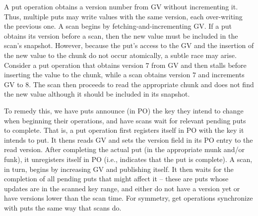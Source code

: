 

A put operation obtains a version number from GV without incrementing it. Thus, multiple puts may write values with the same version, each over-writing the previous one. 
A scan begins by fetching-and-incrementing GV.
If a put obtains its version before a scan, then the new value must be included in the scan's snapshot. 
However, because the put's access to the GV and the insertion of the new value to the chunk do not occur atomically,
a subtle race may arise. Consider a put operation that obtains version $7$ from GV and then stalls before
inserting the value to the chunk, while a scan obtains version $7$ and increments GV to $8$. The scan then proceeds 
to read the appropriate chunk and does not find the new value although it should be included in its snapshot.

To remedy this, we have puts announce (in PO) the key they intend to change when beginning their operations, and have scans wait for relevant pending puts to complete. That is,
a put operation first registers itself in PO with the key it intends to put.
It thens reads GV and sets the version field in its PO entry to the read version. 
After completing the actual put (in the appropriate munk and/or funk), it unregisters itself in PO (i.e., 
indicates that the put is complete).
A scan, in turn, begins by increasing GV and publishing itself. 
It then waits for the completion of all pending puts  that might affect it  -- these are puts whose updates 
are in the scanned key range, and either do not have a version yet or have versions lower than the scan time.
For symmetry, get operations synchronize with puts the same way that scans do. 



